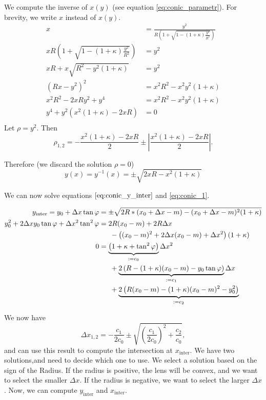 \documentclass[12pt]{article}
\newcommand{\abs}[1]{\left|#1\right|}
\begin{document}
We compute the inverse of $x(y)$ (see equation \eqref{eq:conic_parametr}). For brevity,
we write $x$ instead of $x(y)$.
\begin{align*}
  x & = \frac{y^2}{R \left(1 + \sqrt{1 - (1 + \kappa)\frac{y^2}{R^2}}\right)}\\
  x R \left(1 + \sqrt{1 - (1 + \kappa)\frac{y^2}{R^2}}\right) & = y^2\\
  x R + x \sqrt{R^2 - y^2(1 + \kappa)} & = y^2 \\
  \left(R x - y^2\right)^2 & = x^2 R^2 - x^2 y^2 (1 + \kappa)\\
  x^2 R^2 - 2 x R y^2 + y^4 & = x^2 R^2 - x^2 y^2 (1 + \kappa)\\
  y^4 + y^2 \left(x^2 (1 + \kappa) - 2 x R\right) &= 0\\
\end{align*}
Let $\rho = y^2$. Then
$$
  \rho_{1, 2} = - \frac{x^2 (1 + \kappa) - 2 x R}{2}
    \pm \abs{\frac{x^2 (1 + \kappa) - 2 x R}{2}}.
$$

Therefore (we discard the solution $\rho = 0$)
\begin{equation}\label{eq:conic_inv}
  y(x) = y^{-1}(x) = \pm \sqrt{2 x R - x^2(1 + \kappa)}
\end{equation}

We can now solve equations $\eqref{eq:conic_y_inter}$ and \eqref{eq:conic_1}.

\begin{align*}
  y_\text{inter} = y_0 + \Delta x \tan{\varphi} 
    & = \pm \sqrt{2R * (x_0 + \Delta x - m) - (x_0 + \Delta x - m)^2 (1 + \kappa)}\\
  y_0^2 + 2 \Delta x y_0 \tan\varphi + \Delta x^2 \tan^2\varphi
    & = 2 R (x_0 - m) + 2 R \Delta x \\ & \phantom{==} 
        - \left((x_0 - m)^2 + 2 \Delta x (x_0 - m) + \Delta x^2\right)(1 + \kappa)\\
  0 & = \underbrace{\-\left(1 + \kappa +\tan^2\varphi\right)}_{:= c_0}
        \Delta x^2 \\ & \phantom{==}
        + \underbrace{2 \left(R - (1 + \kappa)(x_0 - m) - y_0 \tan\varphi\right)}_{:=c_1} 
        \Delta x\\ &\phantom{==}
        + \underbrace{2 \left(R (x_0 - m) - (1 + \kappa)(x_0 - m)^2 - y_0^2\right)}_{:=c_2}
\end{align*}

We now have
\begin{equation}\label{eq:conic_dx}
  \Delta x_{1, 2} = - \frac{c_1}{2 c_0} 
    \pm \sqrt{\left(\frac{c_1}{2 c_0}\right)^2 + \frac{c_2}{c_0}},
\end{equation}
and can use this result to compute the intersection at $x_\text{inter}$. We have two
solutions,and need to decide which one to use.
We select a solution based on the sign of the Radius. If the radius is positive, the lens
will be convex, and we want to select the smaller $\Delta x$. If the radius is negative,
we want to select the larger $\Delta x$.
Now, we can compute $y_\text{inter}$ and $x_\text{inter}$.
\end{document}
